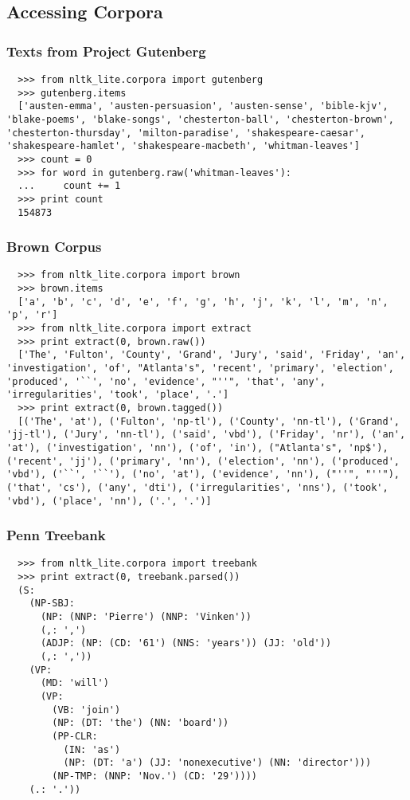 \documentclass[handout]{beamer}
\begin{document}
\subsection{Accessing Corpora}

\begin{frame}[fragile]
\frametitle{Texts from Project Gutenberg}

\begin{verbatim}
  >>> from nltk_lite.corpora import gutenberg
  >>> gutenberg.items
  ['austen-emma', 'austen-persuasion', 'austen-sense', 'bible-kjv', 'blake-poems', 'blake-songs', 'chesterton-ball', 'chesterton-brown', 'chesterton-thursday', 'milton-paradise', 'shakespeare-caesar', 'shakespeare-hamlet', 'shakespeare-macbeth', 'whitman-leaves']
  >>> count = 0
  >>> for word in gutenberg.raw('whitman-leaves'):
  ...     count += 1
  >>> print count
  154873
\end{verbatim}
\end{frame}

\begin{frame}[fragile]
\frametitle{Brown Corpus}
\small

\begin{verbatim}
  >>> from nltk_lite.corpora import brown
  >>> brown.items
  ['a', 'b', 'c', 'd', 'e', 'f', 'g', 'h', 'j', 'k', 'l', 'm', 'n', 'p', 'r']
  >>> from nltk_lite.corpora import extract
  >>> print extract(0, brown.raw())
  ['The', 'Fulton', 'County', 'Grand', 'Jury', 'said', 'Friday', 'an', 'investigation', 'of', "Atlanta's", 'recent', 'primary', 'election', 'produced', '``', 'no', 'evidence', "''", 'that', 'any', 'irregularities', 'took', 'place', '.']
  >>> print extract(0, brown.tagged())
  [('The', 'at'), ('Fulton', 'np-tl'), ('County', 'nn-tl'), ('Grand', 'jj-tl'), ('Jury', 'nn-tl'), ('said', 'vbd'), ('Friday', 'nr'), ('an', 'at'), ('investigation', 'nn'), ('of', 'in'), ("Atlanta's", 'np$'), ('recent', 'jj'), ('primary', 'nn'), ('election', 'nn'), ('produced', 'vbd'), ('``', '``'), ('no', 'at'), ('evidence', 'nn'), ("''", "''"), ('that', 'cs'), ('any', 'dti'), ('irregularities', 'nns'), ('took', 'vbd'), ('place', 'nn'), ('.', '.')]
\end{verbatim}
\end{frame}


\begin{frame}[fragile]
\frametitle{Penn Treebank}
\small

\begin{verbatim}
  >>> from nltk_lite.corpora import treebank
  >>> print extract(0, treebank.parsed())
  (S:
    (NP-SBJ:
      (NP: (NNP: 'Pierre') (NNP: 'Vinken'))
      (,: ',')
      (ADJP: (NP: (CD: '61') (NNS: 'years')) (JJ: 'old'))
      (,: ','))
    (VP:
      (MD: 'will')
      (VP:
        (VB: 'join')
        (NP: (DT: 'the') (NN: 'board'))
        (PP-CLR:
          (IN: 'as')
          (NP: (DT: 'a') (JJ: 'nonexecutive') (NN: 'director')))
        (NP-TMP: (NNP: 'Nov.') (CD: '29'))))
    (.: '.'))
\end{verbatim}
\end{frame}
\end{document}
